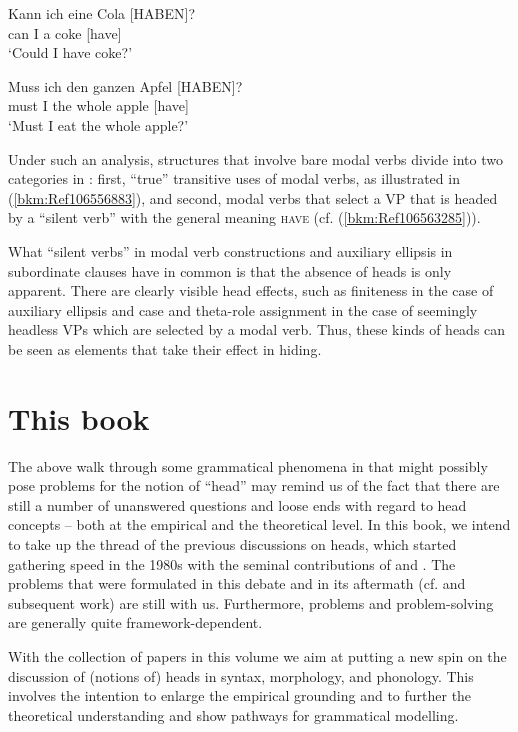 \documentclass[output=paper
  ,nobabel
  ,draftmode
  ,colorlinks, citecolor=brown
]{langscibook}
\begin{document}
\ex
\gll Kann  ich  eine   Cola  [\MakeUppercase{haben}]?\\
       can     I      a       coke   [have]\\
\glt   `Could I have coke?'

\ex
\gll Muss   ich   den    ganzen    Apfel   [\MakeUppercase{haben}]?\\
       must    I      the     whole      apple   [have]\\
\glt   `Must I eat the whole apple?'
\zl


\noindent
Under such an analysis, structures that involve bare modal verbs divide into two categories in
: first, ``true'' transitive uses of modal verbs, as illustrated in (\ref{bkm:Ref106556883}),
and second, modal verbs that select a VP that is headed by a ``silent verb'' with the general meaning
\textsc{have} (cf. (\ref{bkm:Ref106563285})).

What ``silent verbs'' in modal verb constructions and auxiliary ellipsis in subordinate clauses have
in common is that the absence of heads is only apparent. There are clearly visible head effects,
such as finiteness in the case of auxiliary ellipsis and case and theta-role assignment in the case
of seemingly headless VPs which are selected by a modal verb. Thus, these kinds of heads can be seen
as elements that take their effect in hiding.

\section{This book}

The above walk through some grammatical phenomena in  that might possibly pose problems for
the notion of ``head'' may remind us of the fact that there are still a number of unanswered questions
and loose ends with regard to head concepts – both at the empirical and the theoretical level. In
this book, we intend to take up the thread of the previous discussions on heads, which started
gathering speed in the 1980s with the seminal contributions of \citet{Zwicky85a} and
\citet{Hudson1987}. The problems that were formulated in this debate and in its aftermath
(cf. \citealt{CorbettEtAl1993} and subsequent work) are still with us. Furthermore, problems and
problem-solving are generally quite framework-dependent.

With the collection of papers in this volume we aim at putting a new spin on the discussion of
(notions of) heads in syntax, morphology, and phonology. This involves the intention to enlarge the
empirical grounding and to further the theoretical understanding and show pathways for grammatical
modelling.
\end{document}
